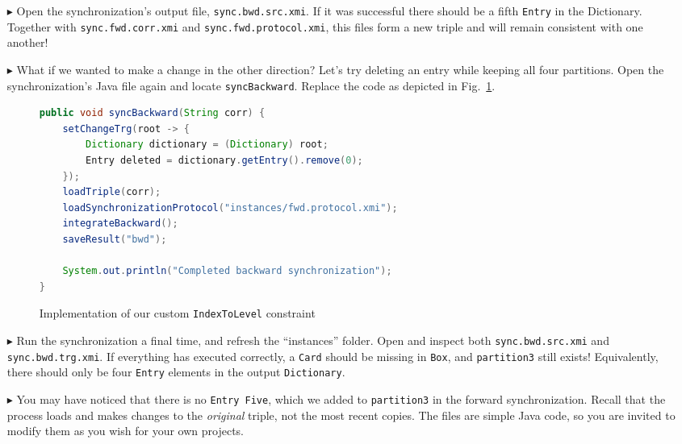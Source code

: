 \begin{itemize}
\item[$\blacktriangleright$] Open the synchronization's output file, \texttt{sync.bwd.src.xmi}. If it was successful there should be a fifth \texttt{Entry} in
the Dictionary. Together with \texttt{sync.fwd.corr.xmi} and \texttt{sync.fwd.protocol.xmi}, this files form a new triple and will remain consistent with one
another!

\item[$\blacktriangleright$] What if we wanted to make a change in the other direction? Let's try deleting an entry while keeping all four partitions. Open
the synchronization's Java file again and locate \texttt{syncBackward}. Replace the code as depicted in Fig.~\ref{eclipse:synchBacward}.

\newpage

\begin{figure}[htbp]
\begin{center}
\begin{lstlisting}[language=Java,backgroundcolor=\color{white}, keywordstyle={\bfseries\color{purple}}]
public void syncBackward(String corr) {
	setChangeTrg(root -> {
		Dictionary dictionary = (Dictionary) root;
		Entry deleted = dictionary.getEntry().remove(0);
	});
	loadTriple(corr);
	loadSynchronizationProtocol("instances/fwd.protocol.xmi");
	integrateBackward();
	saveResult("bwd");

	System.out.println("Completed backward synchronization");
}
\end{lstlisting}
  \caption{Implementation of our custom \texttt{IndexToLevel} constraint}
  \label{eclipse:synchBacward}
\end{center}
\end{figure}

\item[$\blacktriangleright$] Run the synchronization a final time, and refresh the ``instances'' folder. Open and inspect both \texttt{sync.bwd.src.xmi} and
\texttt{sync.\-bwd.\-trg.\-xmi}. If everything has executed correctly, a \texttt{Card} should be missing in \texttt{Box}, and
\texttt{partition3} still exists! Equivalently, there should only be four \texttt{Entry} elements in the output \texttt{Dict\-ion\-ar\-y}.

\item[$\blacktriangleright$] You may have noticed that there is no \texttt{Entry Five}, which we added to \texttt{partition3} in the forward
synchronization. Recall that the process loads and makes changes to the \emph{original} triple, not the most recent copies. The files are simple Java code, so
you are invited to modify them as you wish for your own projects.

\end{itemize}
